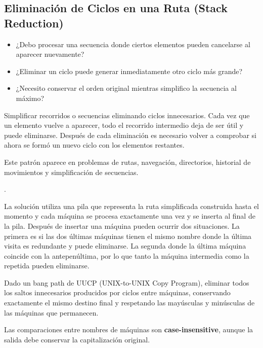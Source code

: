 \subsection{Eliminación de Ciclos en una Ruta (Stack Reduction)}


\begin{itemize}
\item ¿Debo procesar una secuencia donde ciertos elementos pueden cancelarse al aparecer nuevamente?
\item ¿Eliminar un ciclo puede generar inmediatamente otro ciclo más grande?
\item ¿Necesito conservar el orden original mientras simplifico la secuencia al máximo?
\end{itemize}


Simplificar recorridos o secuencias eliminando ciclos innecesarios. Cada vez que un elemento vuelve a aparecer, todo el recorrido intermedio deja de ser útil y puede eliminarse. Después de cada eliminación es necesario volver a comprobar si ahora se formó un nuevo ciclo con los elementos restantes.

Este patrón aparece en problemas de rutas, navegación, directorios, historial de movimientos y simplificación de secuencias.

 .


La solución utiliza una pila que representa la ruta simplificada construida hasta el momento y cada máquina se procesa exactamente una vez y se inserta al final de la pila.
Después de insertar una máquina pueden ocurrir dos situaciones. La primera es si las dos últimas máquinas tienen el mismo nombre donde la última visita es redundante y puede eliminarse. La segunda donde la última máquina coincide con la antepenúltima, por lo que tanto la máquina intermedia como la repetida pueden eliminarse.


Dado un bang path de UUCP (UNIX-to-UNIX Copy Program), eliminar todos los saltos innecesarios producidos por ciclos entre máquinas, conservando exactamente el mismo destino final y respetando las mayúsculas y minúsculas de las máquinas que permanecen.

Las comparaciones entre nombres de máquinas son \textbf{case-insensitive}, aunque la salida debe conservar la capitalización original.

